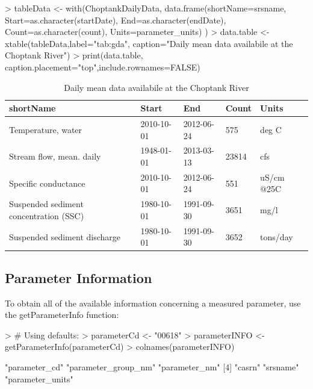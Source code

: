 \documentclass[a4paper,11pt]{article}
\begin{document}
\begin{Schunk}
\begin{Sinput}
> tableData <- with(ChoptankDailyData, 
       data.frame(shortName=srsname, 
       Start=as.character(startDate), 
       End=as.character(endDate), 
       Count=as.character(count),
       Units=parameter_units)
       )
> data.table <- xtable(tableData,label="tab:gda",
     caption="Daily mean data availabile at the Choptank River")
> print(data.table, 
       caption.placement="top",include.rownames=FALSE)
\end{Sinput}
\begin{table}[ht]
\centering
\caption{Daily mean data availabile at the Choptank River} 
\label{tab:gda}
\begin{tabular}{lllll}
  \hline
shortName & Start & End & Count & Units \\ 
  \hline
Temperature, water & 2010-10-01 & 2012-06-24 & 575 & deg C \\ 
  Stream flow, mean. daily & 1948-01-01 & 2013-03-13 & 23814 & cfs \\ 
  Specific conductance & 2010-10-01 & 2012-06-24 & 551 & uS/cm @25C \\ 
  Suspended sediment concentration (SSC) & 1980-10-01 & 1991-09-30 & 3651 & mg/l \\ 
  Suspended sediment discharge & 1980-10-01 & 1991-09-30 & 3652 & tons/day \\ 
   \hline
\end{tabular}
\end{table}\end{Schunk}


\FloatBarrier
\subsection{Parameter Information}
\label{sec:usgsParams}
To obtain all of the available information concerning a measured parameter, use the getParameterInfo function:
\begin{Schunk}
\begin{Sinput}
> # Using defaults:
> parameterCd <- "00618" 
> parameterINFO <- getParameterInfo(parameterCd)
> colnames(parameterINFO)
\end{Sinput}
\begin{Soutput}
[1] "parameter_cd"       "parameter_group_nm" "parameter_nm"      
[4] "casrn"              "srsname"            "parameter_units"   
\end{Soutput}
\end{Schunk}
\end{document}
